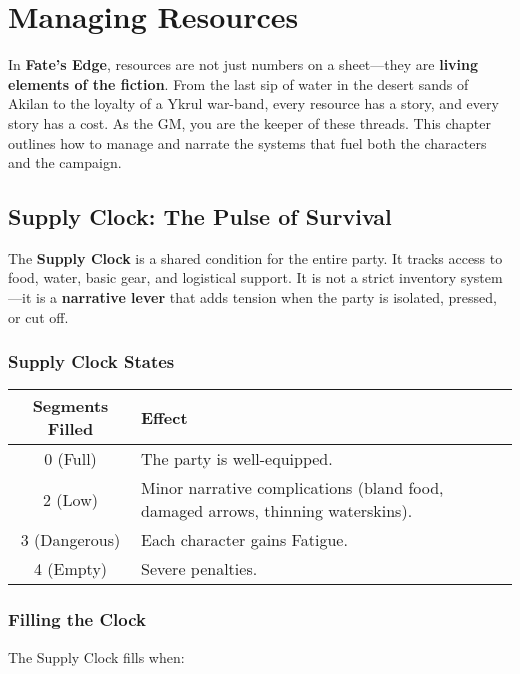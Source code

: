 
\chapter{Managing Resources}

In \textbf{Fate's Edge}, resources are not just numbers on a sheet—they are \textbf{living elements of the fiction}. From the last sip of water in the desert sands of Akilan to the loyalty of a Ykrul war-band, every resource has a story, and every story has a cost. As the GM, you are the keeper of these threads. This chapter outlines how to manage and narrate the systems that fuel both the characters and the campaign.

\section*{Supply Clock: The Pulse of Survival}

The \textbf{Supply Clock} is a shared condition for the entire party. It tracks access to food, water, basic gear, and logistical support. It is not a strict inventory system—it is a \textbf{narrative lever} that adds tension when the party is isolated, pressed, or cut off.

\subsection*{Supply Clock States}

\begin{center}
\begin{tabular}{cl}
\toprule
\textbf{Segments Filled} & \textbf{Effect} \\
\midrule
0 (Full) & The party is well-equipped. \\
2 (Low) & Minor narrative complications (bland food, damaged arrows, thinning waterskins). \\
3 (Dangerous) & Each character gains Fatigue. \\
4 (Empty) & Severe penalties. \\
\bottomrule
\end{tabular}
\end{center}

\subsection*{Filling the Clock}

The Supply Clock fills when:

